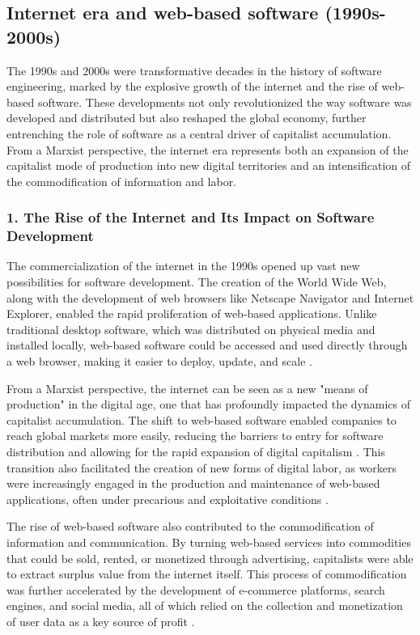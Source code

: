 \begin{refsection}
\begin{multicols}{2}
{}
\subsection{Internet era and web-based software (1990s-2000s)}
{\small
The 1990s and 2000s were transformative decades in the history of software engineering, marked by the explosive growth of the internet and the rise of web-based software. These developments not only revolutionized the way software was developed and distributed but also reshaped the global economy, further entrenching the role of software as a central driver of capitalist accumulation. From a Marxist perspective, the internet era represents both an expansion of the capitalist mode of production into new digital territories and an intensification of the commodification of information and labor.

\subsubsection*{1. The Rise of the Internet and Its Impact on Software Development}

The commercialization of the internet in the 1990s opened up vast new possibilities for software development. The creation of the World Wide Web, along with the development of web browsers like Netscape Navigator and Internet Explorer, enabled the rapid proliferation of web-based applications. Unlike traditional desktop software, which was distributed on physical media and installed locally, web-based software could be accessed and used directly through a web browser, making it easier to deploy, update, and scale \cite{bernerslee1996weaving, naughton2000brief}.

From a Marxist perspective, the internet can be seen as a new "means of production" in the digital age, one that has profoundly impacted the dynamics of capitalist accumulation. The shift to web-based software enabled companies to reach global markets more easily, reducing the barriers to entry for software distribution and allowing for the rapid expansion of digital capitalism \cite{fuchs2014digital}. This transition also facilitated the creation of new forms of digital labor, as workers were increasingly engaged in the production and maintenance of web-based applications, often under precarious and exploitative conditions \cite{scholz2013digital}.

The rise of web-based software also contributed to the commodification of information and communication. By turning web-based services into commodities that could be sold, rented, or monetized through advertising, capitalists were able to extract surplus value from the internet itself. This process of commodification was further accelerated by the development of e-commerce platforms, search engines, and social media, all of which relied on the collection and monetization of user data as a key source of profit \cite{zuboff2015surveillance}.

}
\end{multicols}
\end{refsection}
